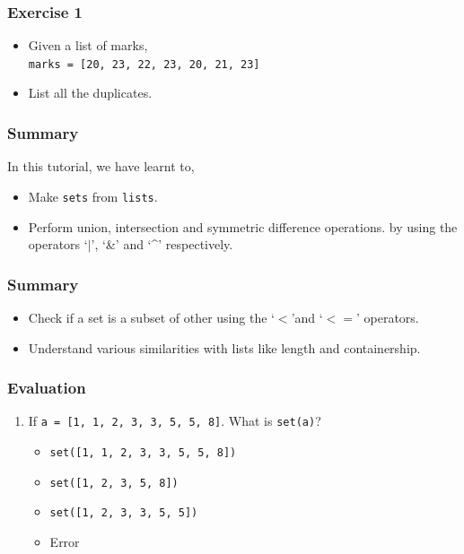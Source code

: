 \documentclass[17pt]{beamer}
\newcounter{saveenumi}
\newcommand{\seti}{\setcounter{saveenumi}{\value{enumi}}}
\begin{document}
\begin{frame}
\frametitle{Exercise 1}
\label{sec-4}


\begin{itemize}
\item Given a list of marks,\\
\texttt{marks = [20, 23, 22, 23, 20, 21, 23]}\pause
\item List all the duplicates.
 \end{itemize}
\end{frame}

\begin{frame}
\frametitle{Summary}
\label{sec-5.1}

 In this tutorial, we have learnt to,

\begin{itemize}
\item Make \texttt{sets} from \texttt{lists}.\pause
\item Perform union, intersection and symmetric difference operations.
   by using the operators `$|$', `\&' and `\textasciicircum'  respectively.
\end{itemize}
\end{frame}

\begin{frame}
\frametitle{Summary}
\label{sec-5.2}

\begin{itemize}
\item Check if a set is a subset of other using the `$<$'and `$<=$' operators.\pause
\item Understand various similarities with lists like length and containership.
\end{itemize}
\end{frame}
\begin{frame}
\frametitle{Evaluation}
\label{sec-6.1}

\begin{enumerate}
\item If \texttt{a = [1, 1, 2, 3, 3, 5, 5, 8]}. What is \texttt{set(a)}?
\vspace{3pt}
	\begin{itemize}
	\item \texttt{set([1, 1, 2, 3, 3, 5, 5, 8])}
	\item \texttt{set([1, 2, 3, 5, 8])}
	\item \texttt{set([1, 2, 3, 3, 5, 5])}
	\item Error
	\end{itemize}
\seti
\end{enumerate}
\end{frame}
\end{document}
